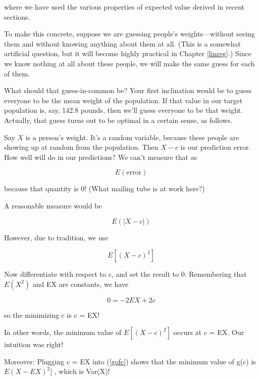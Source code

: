 where we have used the various properties of expected value derived in
recent sections.

To make this concrete, suppose we are guessing people's
weights---without seeing them and without knowing anything about them at
all.  (This is a somewhat artificial question, but it will become highly
practical in Chapter \ref{linreg}.)  Since we know nothing at all about
these people, we will make the same guess for each of them.

What should that guess-in-common be?  Your first inclination would be to
guess everyone to be the mean weight of the population.  If that value
in our target population is, say, 142.8 pounds, then we'll guess
everyone to be that weight.  Actually, that guess turns out to be
optimal in a certain sense, as follows.

Say $X$ is a person's weight.  It's a random variable, because these
people are showing up at random from the population.  Then $X-c$ is our
prediction error.  How well will do in our predictions?  We can't
measure that as

\begin{equation}
E(\textrm{error}) 
\end{equation}

because that quantity is 0!  (What mailing tube is at work here?)

A reasonable measure would be

\begin{equation}
\label{minabs}
E(|X - c|) 
\end{equation}

However, due to tradition, we use

\begin{equation}
\label{minsq}
E[(X - c)^2] 
\end{equation}

Now differentiate with respect to c, and set the result to 0.
Remembering that $E(X^2)$ and EX are constants, we have

\begin{equation}
0 = -2 EX + 2c
\end{equation}

so the minimizing c is c = EX!  

In other words, the minimum value of $E[(X-c)^2]$ occurs at c = EX.  Our
intuition was right!

Moreover:  Plugging c = EX into (\ref{gofc}) shows that the minimum value
of g(c) is $E(X-EX)^2]$ , which is Var(X)!

